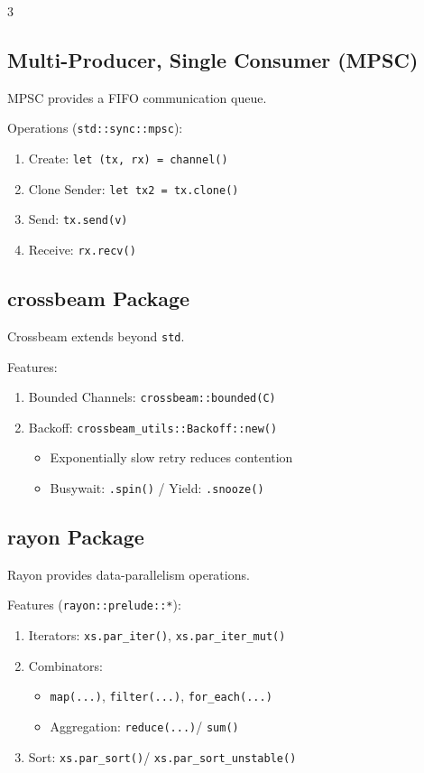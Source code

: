 \documentclass[12pt, a4paper]{article}
\begin{document}
\begin{multicols*}{3}
\subsection{Multi-Producer, Single Consumer (MPSC)}
MPSC provides a FIFO communication queue.

Operations (\lstinline|std::sync::mpsc|):
\begin{enumerate}[\roman*.]
  \item Create: \lstinline|let (tx, rx) = channel()|
  \item Clone Sender: \lstinline|let tx2 = tx.clone()|
  \item Send: \lstinline|tx.send(v)|
  \item Receive: \lstinline|rx.recv()|
\end{enumerate}

\colbreak
\subsection{crossbeam Package}
Crossbeam extends beyond \lstinline|std|.

Features:
\begin{enumerate}[\roman*.]
  \item Bounded Channels: \lstinline|crossbeam::bounded(C)|
  \item Backoff: \lstinline|crossbeam_utils::Backoff::new()|
  \begin{itemize}[leftmargin=*]\vspace{3pt}
    \item Exponentially slow retry reduces contention
    \item Busywait: \lstinline|.spin()| / Yield: \lstinline|.snooze()|
  \end{itemize}
\end{enumerate}

\subsection{rayon Package}
Rayon provides data-parallelism operations.

Features (\lstinline|rayon::prelude::*|):
\begin{enumerate}[\roman*.]
  \item Iterators: \lstinline|xs.par_iter()|, \lstinline|xs.par_iter_mut()|
  \item Combinators:
  \begin{itemize}[leftmargin=*]\vspace{3pt}
    \item \lstinline|map(...)|, \lstinline|filter(...)|, \lstinline|for_each(...)|
    \item Aggregation: \lstinline|reduce(...)|/ \lstinline|sum()| 
  \end{itemize}
  \item Sort: \lstinline|xs.par_sort()|/ \lstinline|xs.par_sort_unstable()|
\end{enumerate}


\end{multicols*}
\end{document}
